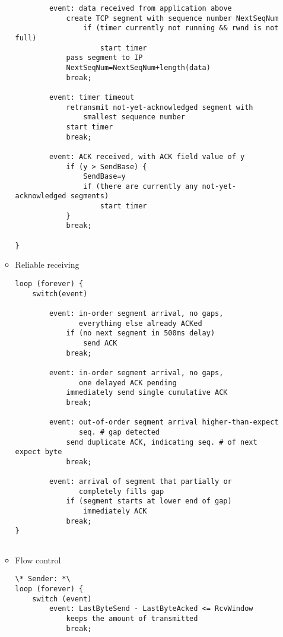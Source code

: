 \begin{enumerate}
\begin{itemize}
\begin{lstlisting}
        event: data received from application above
            create TCP segment with sequence number NextSeqNum
                if (timer currently not running && rwnd is not full)
                    start timer
            pass segment to IP
            NextSeqNum=NextSeqNum+length(data)
            break;
            
        event: timer timeout
            retransmit not-yet-acknowledged segment with
                smallest sequence number
            start timer
            break;
            
        event: ACK received, with ACK field value of y
            if (y > SendBase) {
                SendBase=y
                if (there are currently any not-yet-acknowledged segments)
                    start timer
            }
            break;
            
}

        \end{lstlisting}
        
        \item Reliable receiving
        
        \begin{lstlisting}
loop (forever) {
    switch(event)
    
        event: in-order segment arrival, no gaps,
               everything else already ACKed
            if (no next segment in 500ms delay)
                send ACK
            break;
            
        event: in-order segment arrival, no gaps,
               one delayed ACK pending
            immediately send single cumulative ACK
            break;

        event: out-of-order segment arrival higher-than-expect
               seq. # gap detected
            send duplicate ACK, indicating seq. # of next expect byte
            break;

        event: arrival of segment that partially or
               completely fills gap
            if (segment starts at lower end of gap)
                immediately ACK
            break;
}
                
        \end{lstlisting}
        
        \item Flow control

        \begin{lstlisting}
\* Sender: *\
loop (forever) {
    switch (event)
        event: LastByteSend - LastByteAcked <= RcvWindow
            keeps the amount of transmitted
            break;


\end{lstlisting}
\end{itemize}
\end{enumerate}
